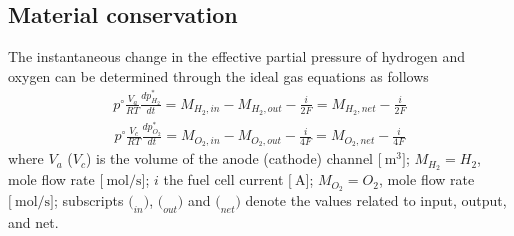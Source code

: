 \documentclass[11pt,a4paper]{article}
\numberwithin{equation}{section}
\theoremstyle{it}
\theoremstyle{definition}
\begin{document}
\subsection{Material conservation}
The instantaneous change in the effective partial pressure of hydrogen and oxygen can be determined through the ideal gas equations as follows
\begin{equation}\label{eq14}
	\begin{aligned}
		p^\circ\frac{V_a}{RT}\frac{dp_{H_2}^*}{dt} = M_{H_2,in} - M_{H_2,out} - \frac{i}{2F} = M_{H_2,net} - \frac{i}{2F}
	\end{aligned}
\end{equation}
\begin{equation}\label{eq15}
	\begin{aligned}
		p^\circ\frac{V_c}{RT}\frac{dp_{O_2}^*}{dt} = M_{O_2,in} - M_{O_2,out} - \frac{i}{4F} = M_{O_2,net} - \frac{i}{4F}
	\end{aligned}
\end{equation}
where $V_a$ ($V_c$) is the volume of the anode (cathode) channel $\Big[\SI{}{\cubic\meter}\Big]$; $M_{H_2}=H_2$, mole flow rate $\Big[\SI{}{\mole\per\second}\Big]$; $i$ the fuel cell current $\Big[\SI{}{\ampere}\Big]$; $M_{O_2}=O_2$, mole flow rate $\Big[\SI{}{\mole\per\second}\Big]$; subscripts $\Big(_{in}\Big)$, $\Big(_{out}\Big)$ and $\Big(_{net}\Big)$ denote the values related to input, output, and net.
\end{document}
